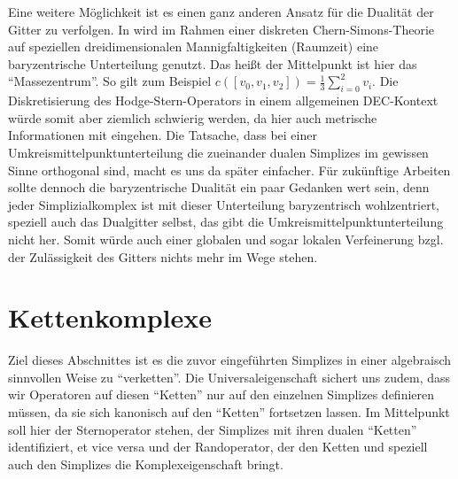 \begin{fazit}
    Eine weitere Möglichkeit ist es einen ganz anderen Ansatz für die Dualität der Gitter zu verfolgen.
    In \cite{sensen} wird im Rahmen einer diskreten Chern-Simons-Theorie auf speziellen dreidimensionalen Mannigfaltigkeiten (Raumzeit) eine baryzentrische Unterteilung genutzt.
    Das heißt der Mittelpunkt ist hier das "`Massezentrum"'.
    So gilt zum Beispiel \( c\left( \left[ v_{0},v_{1},v_{2} \right] \right) = \frac{1}{3}\sum_{i=0}^{2}v_{i}\).
    Die Diskretisierung des Hodge-Stern-Operators in einem allgemeinen DEC-Kontext würde somit aber ziemlich schwierig werden, da hier auch metrische Informationen mit eingehen.
    Die Tatsache, dass bei einer Umkreismittelpunktunterteilung die zueinander dualen Simplizes im gewissen Sinne orthogonal sind, 
    macht es uns da später einfacher.
    Für zukünftige Arbeiten sollte dennoch die baryzentrische Dualität ein paar Gedanken wert sein, denn jeder Simplizialkomplex ist mit dieser Unterteilung baryzentrisch wohlzentriert,
    speziell auch das Dualgitter selbst, das gibt die Umkreismittelpunktunterteilung nicht her. 
    Somit würde auch einer globalen und sogar lokalen Verfeinerung bzgl. der Zulässigkeit des Gitters nichts mehr im Wege stehen.
  \end{fazit}









\section{Kettenkomplexe}

  \begin{ziel}
    Ziel dieses Abschnittes ist es die zuvor eingeführten Simplizes in einer algebraisch sinnvollen Weise zu "`verketten"'.
    Die Universaleigenschaft sichert uns zudem, dass wir Operatoren auf diesen "`Ketten"' nur auf den einzelnen Simplizes definieren
    müssen, da sie sich kanonisch auf den "`Ketten"' fortsetzen lassen.
    Im Mittelpunkt soll hier der Sternoperator stehen, der Simplizes mit ihren dualen "`Ketten"' identifiziert, et vice versa
    und der Randoperator, der den Ketten und speziell auch den Simplizes die Komplexeigenschaft bringt.
  \end{ziel}

